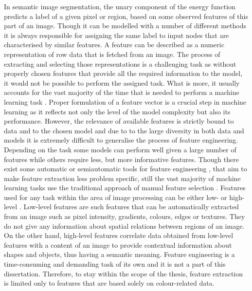 In semantic image segmentation, the unary component of the energy function predicts a label of a given pixel or region, based on some observed features of this part of an image. Though it can be modelled with a number of different methods it is always responsible for assigning the same label to input nodes that are characterised by similar features. A feature can be described as a numeric representation of row data that is fetched from an image. The process of extracting and selecting those representations is a challenging task as without properly chosen features that provide all the required information to the model, it would not be possible to perform the assigned task. What is more, it usually accounts for the vast majority of the time that is needed to perform a machine learning task \cite{features_oreilly}. Proper formulation of a feature vector is a crucial step in machine learning as it reflects not only the level of the model complexity but also its performance. However, the relevance of available features is strictly bound to data and to the chosen model and due to to the large diversity in both data and models it is extremely difficult to generalise the process of feature engineering. Depending on the task some models can perform well given a large number of features while others require less, but more informative features. Though there exist some automatic or semiautomatic tools for feature engineering \cite{python_h2o, python_tpot, python_auto-sklearn}, that aim to make feature extraction less problem specific, still the vast majority of machine learning tasks use the traditional approach of manual feature selection \cite{feature_engineering}. 
Features used for any task within the area of image processing can be either low- or high-level \cite{feature_extraction_book}. Low-level features are such features that can be automatically extracted from an image such as pixel intensity, gradients, colours, edges or textures. They do not give any information about spatial relations between regions of an image. On the other hand, high-level features correlate data obtained from low-level features with a content of an image to provide contextual information about shapes and objects, thus having a semantic meaning. Feature engineering is a time-consuming and demanding task of its own and it is not a part of this dissertation. Therefore, to stay within the scope of the thesis, feature extraction is limited only to features that are based solely on colour-related data.

